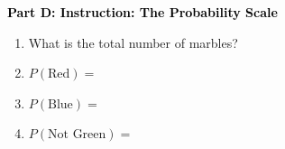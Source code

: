 \documentclass[12pt, letterpaper, fleqn]{article}
\newcommand{\blank}{\underline{\hspace{2.2cm}}}
\begin{document}
\newpage

\begin{tcolorbox}[colback=customteal!20]
\large\textcolor{black}{\textbf{Part D: Instruction: The Probability Scale}}
\end{tcolorbox}

\vspace{3mm}

\begin{enumerate}[itemsep=2.2cm, leftmargin=0.6cm, resume]
\item What is the total number of marbles? \blank
\item $P(\text{Red}) =$ \blank
\item $P(\text{Blue}) =$ \blank
\item $P(\text{Not Green}) =$ \blank
\end{enumerate}
\end{document}
